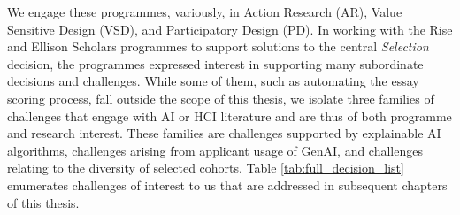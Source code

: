 We engage these programmes, variously, in Action Research (AR), Value Sensitive Design (VSD), and Participatory Design (PD). In working with the Rise and Ellison Scholars programmes to support solutions to the central \emph{Selection} decision, the programmes expressed interest in supporting many subordinate decisions and challenges. While some of them, such as automating the essay scoring process, fall outside the scope of this thesis, we isolate three families of challenges that engage with AI or HCI literature and are thus of both programme and research interest. These families are challenges supported by explainable AI algorithms, challenges arising from applicant usage of GenAI, and challenges relating to the diversity of selected cohorts. Table \ref{tab:full_decision_list} enumerates challenges of interest to us that are addressed in subsequent chapters of this thesis.
